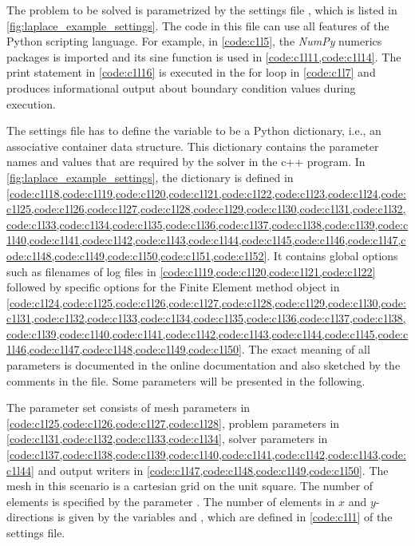 The problem to be solved is parametrized by the settings file , which is listed in \cref{fig:laplace_example_settings}. The code in this file can use all features of the Python scripting language. For example, in \cref{code:c1l5}, the \emph{NumPy} numerics packages is imported and its sine function is used in \cref{code:c1l11,code:c1l14}. The print statement in \cref{code:c1l16} is executed in the for loop in \cref{code:c1l7} and produces informational output about boundary condition values during execution. 

The settings file has to define the variable  to be a Python dictionary, i.e., an associative container data structure. This dictionary contains the parameter names and values that are required by the solver in the c++ program. 
In \cref{fig:laplace_example_settings}, the  dictionary is defined in \cref{code:c1l18,code:c1l19,code:c1l20,code:c1l21,code:c1l22,code:c1l23,code:c1l24,code:c1l25,code:c1l26,code:c1l27,code:c1l28,code:c1l29,code:c1l30,code:c1l31,code:c1l32,code:c1l33,code:c1l34,code:c1l35,code:c1l36,code:c1l37,code:c1l38,code:c1l39,code:c1l40,code:c1l41,code:c1l42,code:c1l43,code:c1l44,code:c1l45,code:c1l46,code:c1l47,code:c1l48,code:c1l49,code:c1l50,code:c1l51,code:c1l52}. It contains global options such as filenames of log files in \cref{code:c1l19,code:c1l20,code:c1l21,code:c1l22} followed by specific options for the Finite Element method object in \cref{code:c1l24,code:c1l25,code:c1l26,code:c1l27,code:c1l28,code:c1l29,code:c1l30,code:c1l31,code:c1l32,code:c1l33,code:c1l34,code:c1l35,code:c1l36,code:c1l37,code:c1l38,code:c1l39,code:c1l40,code:c1l41,code:c1l42,code:c1l43,code:c1l44,code:c1l45,code:c1l46,code:c1l47,code:c1l48,code:c1l49,code:c1l50}. The exact meaning of all parameters is documented in the online documentation \cite{opendihuWeb} and also sketched by the comments in the file. Some parameters will be presented in the following.

The parameter set consists of mesh parameters in \cref{code:c1l25,code:c1l26,code:c1l27,code:c1l28}, problem parameters in \cref{code:c1l31,code:c1l32,code:c1l33,code:c1l34}, 
solver parameters in \cref{code:c1l37,code:c1l38,code:c1l39,code:c1l40,code:c1l41,code:c1l42,code:c1l43,code:c1l44} and output writers in \cref{code:c1l47,code:c1l48,code:c1l49,code:c1l50}. 
The mesh in this scenario is a cartesian grid on the unit square. The number of elements is specified by the parameter . The number of elements in $x$ and $y$-directions is given by the variables  and , which are defined in \cref{code:c1l1} of the settings file. 

